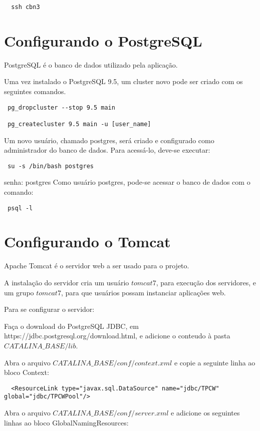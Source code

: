 \documentclass{article}
\begin{document}
\begin{verbatim}
  ssh cbn3
\end{verbatim}

\section{Configurando o PostgreSQL}

PostgreSQL é o banco de dados utilizado pela aplicação.

Uma vez instalado o PostgreSQL 9.5, um cluster novo pode ser criado com os seguintes comandos.
\begin{verbatim}
 pg_dropcluster --stop 9.5 main

 pg_createcluster 9.5 main -u [user_name]
\end{verbatim}

Um novo usuário, chamado postgres, será criado e configurado como administrador do banco de dados. Para acessá-lo, deve-se executar:
\begin{verbatim}
 su -s /bin/bash postgres

\end{verbatim}
 senha: postgres
Como usuário postgres, pode-se acessar o banco de dados com o comando:
\begin{verbatim}
 psql -l 
\end{verbatim}

\section{Configurando o Tomcat}

Apache Tomcat é o servidor web a ser usado para o projeto.

A instalação do servidor cria um usuário $tomcat7$, para execução dos servidores, e um grupo $tomcat7$, para que usuários possam instanciar aplicações web.

Para se configurar o servidor:

Faça o download do PostgreSQL JDBC, em https://jdbc.postgresql.org/download.html, e adicione o conteudo à pasta $CATALINA\_BASE/lib$.

Abra o arquivo $CATALINA\_BASE/conf/context.xml$ e copie a seguinte linha ao bloco Context:
\begin{verbatim}
  <ResourceLink type="javax.sql.DataSource" name="jdbc/TPCW" global="jdbc/TPCWPool"/>

\end{verbatim}


Abra o arquivo $CATALINA\_BASE/conf/server.xml$ e adicione os seguintes linhas ao bloco GlobalNamingResources:
\end{document}
